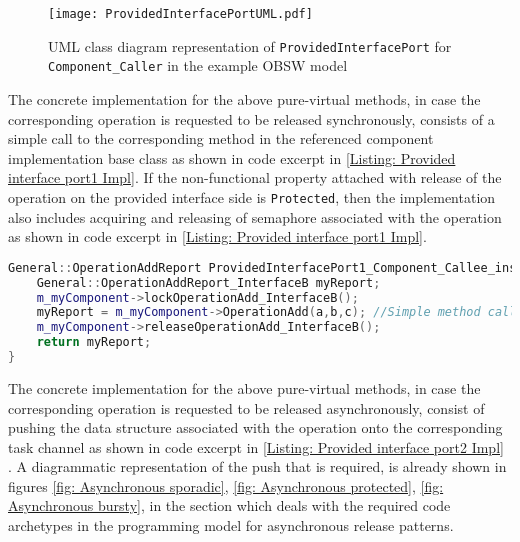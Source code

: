 \begin{figure}[h]
	\centering
	\texttt{[image: ProvidedInterfacePortUML.pdf]}
	\caption{UML class diagram representation of \texttt{Provided\allowbreak Interface\allowbreak Port} for \texttt{Component\allowbreak\_Caller} in the example OBSW model}
	\label{fig: Provided interface port UML}
\end{figure}   

The concrete implementation for the above pure-virtual methods, in case the corresponding operation is requested to be released synchronously, consists of a simple call to the corresponding method in the referenced component implementation base class as shown in code excerpt in \cref{Listing: Provided interface port1 Impl}. If the non-functional property attached with release of the operation on the provided interface side is \texttt{Protected}, then the implementation also includes acquiring and releasing of semaphore associated with the operation as shown in code excerpt in \cref{Listing: Provided interface port1 Impl}. 

\begin{Listing}
\begin{lstlisting}[language=C++]
General::OperationAddReport ProvidedInterfacePort1_Component_Callee_inst::OperationAdd (const IntegerType& a,const IntegerType& b,IntegerType& c) {
	General::OperationAddReport_InterfaceB myReport;
	m_myComponent->lockOperationAdd_InterfaceB();
	myReport = m_myComponent->OperationAdd(a,b,c); //Simple method call
	m_myComponent->releaseOperationAdd_InterfaceB();
	return myReport;
}
\end{lstlisting}
\caption{Code excerpt from the generated code for operation \texttt{OperationAdd} access in \texttt{Provided\allowbreak Interface\allowbreak Port1} which is called synchronously and has \texttt{Protected} as a non-functional property attached to it}
\label{Listing: Provided interface port1 Impl}
\end{Listing}

The concrete implementation for the above pure-virtual methods, in case the corresponding operation is requested to be released asynchronously, consist of pushing the data structure associated with the operation onto the corresponding task channel as shown in code excerpt in \cref{Listing: Provided interface port2 Impl} . A diagrammatic representation of the push that is required, is already shown in figures \cref{fig: Asynchronous sporadic}, \cref{fig: Asynchronous protected}, \cref{fig: Asynchronous bursty}, in the section which deals with the required code archetypes in the programming model for asynchronous release patterns.

